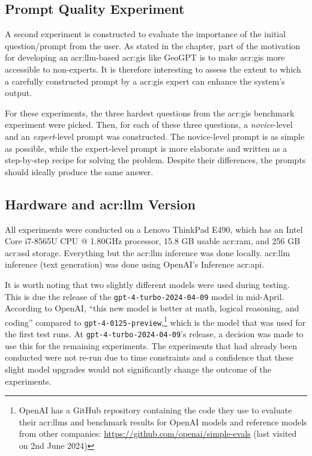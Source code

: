 \subsection{Prompt Quality Experiment}
\label{subsec:prompt-quality-test-setup}

A second experiment is constructed to evaluate the importance of the initial question/prompt from the user. As stated in the  chapter, part of the motivation for developing an \acrshort{acr:llm}-based \acrshort{acr:gis} like GeoGPT is to make \acrshort{acr:gis} more accessible to non-experts. It is therefore interesting to assess the extent to which a carefully constructed prompt by a \acrshort{acr:gis} expert can enhance the system's output.

For these experiments, the three hardest questions from the \acrshort{acr:gis} benchmark experiment were picked. Then, for each of these three questions, a \textit{novice}-level and an \textit{expert}-level prompt was constructed. The novice-level prompt is as simple as possible, while the expert-level prompt is more elaborate and written as a step-by-step recipe for solving the problem. Despite their differences, the prompts should ideally produce the same answer.

\subsection[Hardware and LLM Version]{Hardware and \acrshort{acr:llm} Version}
\label{subsec:hardware-and-model-version}

All experiments were conducted on a Lenovo ThinkPad E490, which has an Intel{\textregistered} Core\texttrademark{} i7-8565U CPU @ 1.80GHz processor, 15.8 GB usable \acrshort{acr:ram}, and 256 GB \acrshort{acr:ssd} storage. Everything but the \acrshort{acr:llm} inference was done locally. \acrshort{acr:llm} inference (text generation) was done using OpenAI's Inference \acrshort{acr:api}.

It is worth noting that two slightly different models were used during testing. This is due the release of the \texttt{gpt-4-turbo-2024-04-09} model in mid-April. According to OpenAI, \enquote{this new model is better at math, logical reasoning, and coding} compared to \texttt{gpt-4-0125-preview},\footnote{OpenAI has a GitHub repository containing the code they use to evaluate their \glspl{acr:llm} and benchmark results for OpenAI models and reference models from other companies: \url{https://github.com/openai/simple-evals} (last visited on 2nd June 2024)} which is the model that was used for the first test runs. At \texttt{gpt-4-turbo-2024-04-09}'s release, a decision was made to use this for the remaining experiments. The experiments that had already been conducted were not re-run due to time constraints and a confidence that these slight model upgrades would not significantly change the outcome of the experiments.


